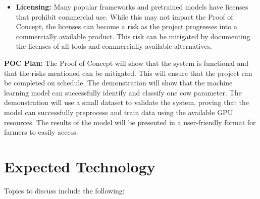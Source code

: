 \documentclass{article}
\begin{document}
\begin{itemize}
  \item \noindent \textbf{Licensing:} Many popular frameworks and pretrained models have licenses that prohibit commercial use. While this may not impact the Proof of Concept, the licenses can become a risk as the project progresses into a commercially available product. This risk can be mitigated by documenting the licenses of all tools and commercially available alternatives.
\end{itemize}

\noindent \textbf{POC Plan:} The Proof of Concept will show that the system is functional and that the risks mentioned can be mitigated. This will ensure that the project can be completed on schedule. 
The demonstration will show that the machine learning model can successfully identify and classify one cow parameter. The demonstration will use a small dataset to validate the system, proving that the model can successfully preprocess and train data using the available GPU resources. The results of the model will be presented in a user-friendly format for farmers to easily access. 

\section{Expected Technology}



Topics to discuss include the following:
\end{document}

